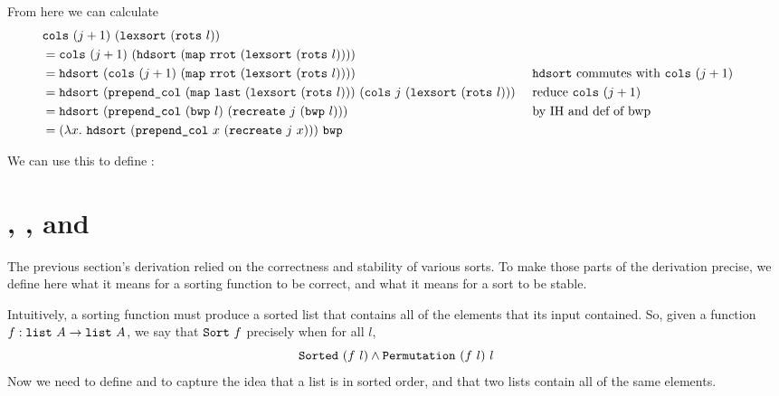 \documentclass[11pt]{thesis}
\begin{document}
From here we can calculate
\begin{align*}
  &\texttt{cols}~(j+1)~(\texttt{lexsort}~(\texttt{rots}~l)) \\
&= \texttt{cols}~(j+1)~(\texttt{hdsort}~(\texttt{map}~\texttt{rrot}~(\texttt{lexsort}~(\texttt{rots}~l)))) \\
&= \texttt{hdsort}~(\texttt{cols}~(j+1)~(\texttt{map}~\texttt{rrot}~(\texttt{lexsort}~(\texttt{rots}~l))))
&&\text{ \texttt{hdsort} commutes with $\texttt{cols}~(j+1)$ } \\
&= \texttt{hdsort}~(\texttt{prepend\_col}~(\texttt{map}~\texttt{last}~(\texttt{lexsort}~(\texttt{rots}~l)))~(\texttt{cols}~j~(\texttt{lexsort}~(\texttt{rots}~l)))
  &&\text{ reduce $\texttt{cols}~(j+1)$ } \\
&= \texttt{hdsort}~(\texttt{prepend\_col}~(\texttt{bwp}~l)~(\texttt{recreate}~j~(\texttt{bwp}~l)))
  &&\text{ by IH and def of bwp } \\
&= (\lambda x.~\texttt{hdsort}~(\texttt{prepend\_col}~x~(\texttt{recreate}~j~x)))~\texttt{bwp}
\end{align*}

We can use this to define :


\section{, , and }
\label{sec:sorted_perm_stable}

The previous section's derivation relied on the correctness and stability of
various sorts. To make those parts of the derivation precise, we
define here what it means for a sorting function to be correct, and
what it means for a sort to be stable.

Intuitively, a sorting function must produce a sorted list that
contains all of the elements that its input contained. So, given a function $f : \texttt{list}~A \to \texttt{list}~A$, we say that $\texttt{Sort}~f$ precisely when for all $l$,
\begin{equation*}
  \texttt{Sorted}~(f~l) \land \texttt{Permutation}~(f~l)~l
\end{equation*}
Now we need to define  and  to capture
the idea that a list is in sorted order, and that two lists contain
all of the same elements.

\subsection{}
\label{subsec:sorted}
\end{document}
